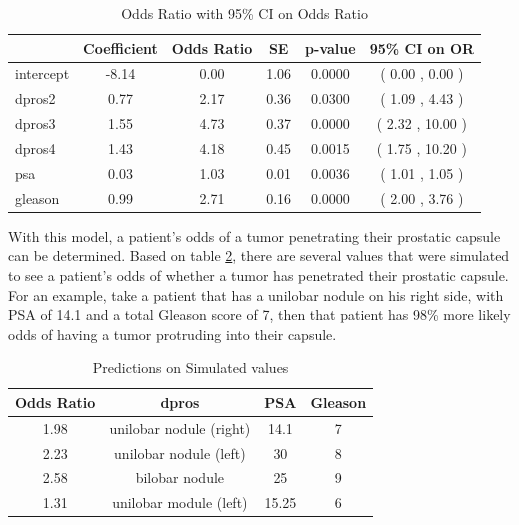 \documentclass{article}\usepackage[]{graphicx}\usepackage[]{color}
\begin{document}
\begin{table}[ht]
\centering
\caption{Odds Ratio with 95\% CI on Odds Ratio}
\label{odds}
\begin{tabular}{|l|ccccc|}
  \hline
 & Coefficient & Odds Ratio & SE & p-value & 95\% CI on OR \\ 
  \hline
intercept & -8.14 & 0.00 & 1.06 & 0.0000 & ( 0.00 , 0.00 ) \\ 
  dpros2 & 0.77 & 2.17 & 0.36 & 0.0300 & ( 1.09 , 4.43 ) \\ 
  dpros3 & 1.55 & 4.73 & 0.37 & 0.0000 & ( 2.32 , 10.00 ) \\ 
  dpros4 & 1.43 & 4.18 & 0.45 & 0.0015 & ( 1.75 , 10.20 ) \\ 
  psa & 0.03 & 1.03 & 0.01 & 0.0036 & ( 1.01 , 1.05 ) \\ 
  gleason & 0.99 & 2.71 & 0.16 & 0.0000 & ( 2.00 , 3.76 ) \\ 
   \hline
\end{tabular}
\end{table}
With this model, a patient's odds of a tumor penetrating their prostatic capsule can be determined. Based on table \ref{prediction}, there are several values that were simulated to see a patient's odds of whether a tumor has penetrated their prostatic capsule. For an example, take a patient that has a unilobar nodule on his right side, with PSA of 14.1 and a total Gleason score of 7, then that patient has 98\% more likely odds of having a tumor protruding into their capsule. 
\begin{table}
\begin{center}
\caption{Predictions on Simulated values}
\label{prediction}
\begin{tabular}{c|c|c|c}
Odds Ratio & dpros & PSA & Gleason \\
\hline
1.98 & unilobar nodule (right) & 14.1 & 7 \\
2.23 & unilobar nodule (left) & 30 & 8 \\
2.58 & bilobar nodule & 25 & 9 \\
1.31 & unilobar module (left) & 15.25 & 6\\
\end{tabular}
\end{center}
\end{table}
\end{document}
